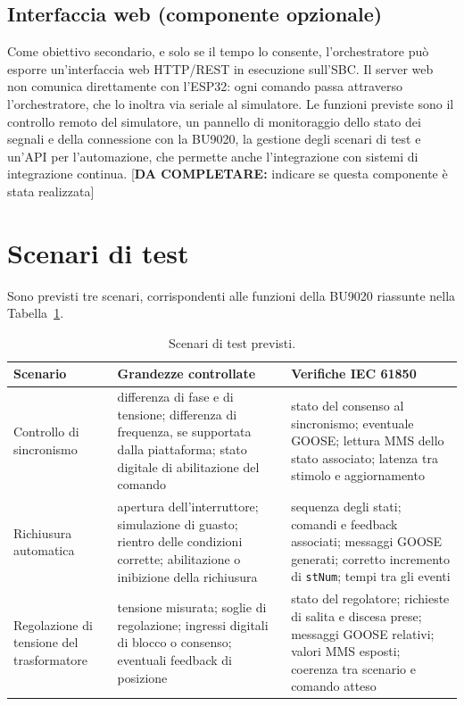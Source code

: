 \documentclass[11pt,a4paper,italian,oneside,openany]{book}
\newcommand{\daf}[1]{{\color{red}[\textbf{DA COMPLETARE:} #1]}}
\begin{document}
\subsection{Interfaccia web (componente opzionale)}
Come obiettivo secondario, e solo se il tempo lo consente, l'orchestratore può esporre un'interfaccia web HTTP/REST in esecuzione sull'SBC. Il server web non comunica direttamente con l'ESP32: ogni comando passa attraverso l'orchestratore, che lo inoltra via seriale al simulatore. Le funzioni previste sono il controllo remoto del simulatore, un pannello di monitoraggio dello stato dei segnali e della connessione con la BU9020, la gestione degli scenari di test e un'API per l'automazione, che permette anche l'integrazione con sistemi di integrazione continua. \daf{indicare se questa componente è stata realizzata}

\section{Scenari di test}
Sono previsti tre scenari, corrispondenti alle funzioni della BU9020 riassunte nella Tabella~\ref{tab:scenari}.

\begin{table}[htbp]
\centering
\begin{tabular}{@{}p{2.8cm}p{4.8cm}p{5.4cm}@{}}
\toprule
\textbf{Scenario} & \textbf{Grandezze controllate} & \textbf{Verifiche IEC 61850} \\
\midrule
Controllo di sincronismo &
differenza di fase e di tensione; differenza di frequenza, se supportata dalla piattaforma; stato digitale di abilitazione del comando &
stato del consenso al sincronismo; eventuale GOOSE; lettura MMS dello stato associato; latenza tra stimolo e aggiornamento \\
\addlinespace
Richiusura automatica &
apertura dell'interruttore; simulazione di guasto; rientro delle condizioni corrette; abilitazione o inibizione della richiusura &
sequenza degli stati; comandi e feedback associati; messaggi GOOSE generati; corretto incremento di \texttt{stNum}; tempi tra gli eventi \\
\addlinespace
Regolazione di tensione del trasformatore &
tensione misurata; soglie di regolazione; ingressi digitali di blocco o consenso; eventuali feedback di posizione &
stato del regolatore; richieste di salita e discesa prese; messaggi GOOSE relativi; valori MMS esposti; coerenza tra scenario e comando atteso \\
\bottomrule
\end{tabular}
\caption{Scenari di test previsti.}
\label{tab:scenari}
\end{table}
\end{document}
